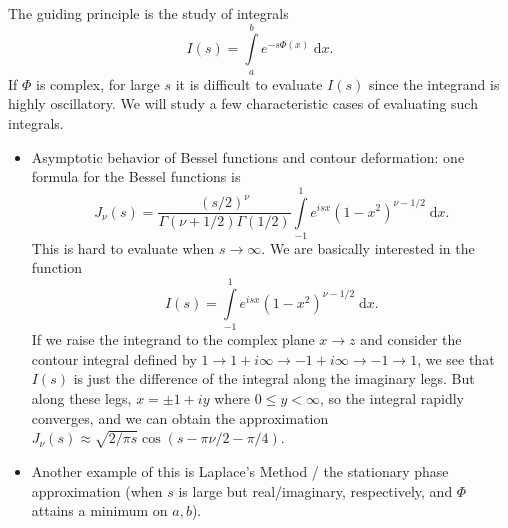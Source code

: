 \documentclass[11pt,
        usenames, %
        dvipsnames %
    ]{report}
\newcommand*{\p}[1]{\left(#1\right)}
\begin{document}
The guiding principle is the study of integrals
\begin{equation}
    I(s) = \int\limits_a^b e^{-s \Phi(x)}\;\mathrm{d}x.
\end{equation}
If $\Phi$ is complex, for large $s$ it is difficult to evaluate $I(s)$ since the
integrand is highly oscillatory. We will study a few characteristic cases of
evaluating such integrals.
\begin{itemize}
    \item Asymptotic behavior of Bessel functions and contour deformation: one
        formula for the Bessel functions is
        \begin{equation}
            J_\nu(s) = \frac{(s/2)^\nu}{\Gamma\p{\nu + 1/2}\Gamma(1/2)}
                \int\limits_{-1}^1 e^{isx}\p{1 - x^2}^{\nu - 1/2}
                    \;\mathrm{d}x.
        \end{equation}
        This is hard to evaluate when $s \to \infty$. We are basically
        interested in the function
        \begin{equation}
            I(s) = \int\limits_{-1}^1 e^{isx}\p{1 - x^2}^{\nu - 1/2}
                \;\mathrm{d}x.
        \end{equation}
        If we raise the integrand to the complex plane $x \to z$ and consider
        the contour integral defined by $1 \to 1 + i\infty \to -1 + i\infty \to
        -1 \to 1$, we see that $I(s)$ is just the difference of the integral
        along the imaginary legs. But along these legs, $x = \pm 1 + iy$ where
        $0 \leq y < \infty$, so the integral rapidly converges, and we can
        obtain the approximation $J_\nu(s) \approx \sqrt{2/\pi s} \cos\p{s - \pi
        \nu/2 - \pi/4}$.

    \item Another example of this is Laplace's Method / the stationary phase
        approximation (when $s$ is large but real/imaginary, respectively, and
        $\Phi$ attains a minimum on $a, b$).


\end{itemize}
\end{document}
